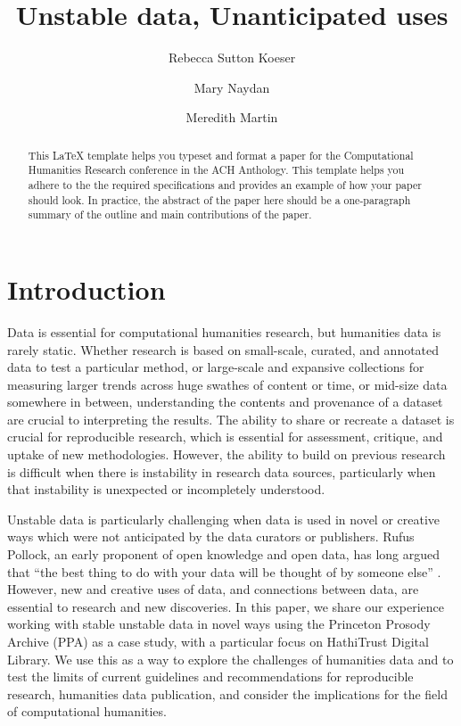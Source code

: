 \documentclass{anthology-ch}         %
\title{Unstable data, Unanticipated uses}
\author[1]{Rebecca Sutton Koeser}[
  orcid=0000-0002-8762-8057
]
\author[1]{Mary Naydan}[
  orcid=0000-0002-7960-3175
]
\author[1,2]{Meredith Martin}[
  orcid=0000-0003-0214-8757
]
\affiliation{1}{Center for Digital Humanities, Princeton University, Princeton, New Jersey, USA}
\begin{document}
\maketitle

\begin{abstract}
This LaTeX template helps you typeset and format a paper for the Computational Humanities Research conference in the ACH Anthology. This template helps you adhere to the the required specifications and provides an example of how your paper should look. In practice, the abstract of the paper here should be a one-paragraph summary of the outline and main contributions of the paper.  
\end{abstract}

\section{Introduction} 

Data is essential for computational humanities research, but humanities data is rarely static. Whether research is based on small-scale, curated, and annotated data to test a particular method, or large-scale and expansive collections for measuring larger trends across huge swathes of content or time, or mid-size data somewhere in between, understanding the contents and provenance of a dataset are crucial to interpreting the results. The ability to share or recreate a dataset is crucial for reproducible research, which is essential for assessment, critique, and uptake of new methodologies. However, the ability to build on previous research is difficult when there is instability in research data sources,  particularly when that instability is unexpected or incompletely understood. 

Unstable data is particularly challenging when data is used in novel or creative ways which were not anticipated by the data curators or publishers. Rufus Pollock, an early proponent of open knowledge and open data, has long argued that “the best thing to do with your data will be thought of by someone else” \cite{ocr} \cite{pollock_open_2011}. However, new and creative uses of data, and connections between data, are essential to research and new discoveries. In this paper, we share our experience working with stable unstable data in novel ways using the Princeton Prosody Archive (PPA) as a case study, with a particular focus on HathiTrust Digital Library. We use this as a way to explore the challenges of humanities data and to test the limits of current guidelines and  recommendations for reproducible research, humanities data publication, and consider the implications for the field of computational humanities. 
\end{document}
